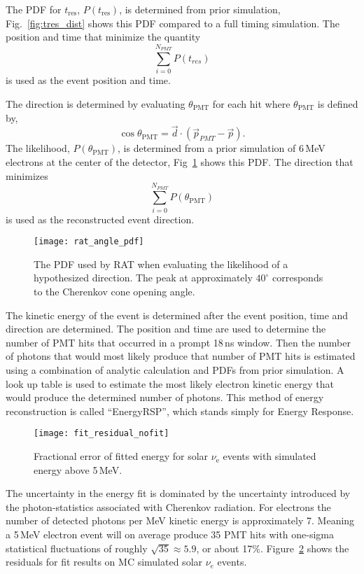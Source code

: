 The PDF for $t_{\mathrm{res}}$, $P(t_{\mathrm{res}})$, is determined from prior simulation,
Fig.~\ref{fig:tres_dist} shows this PDF compared to a full timing simulation.
The position and time that minimize the quantity
\begin{equation}
\sum_{i=0}^{N_{PMT}} P(t_{res}) %
\end{equation}
is used as the event position and time.

The direction is determined by evaluating $\theta_{\mathrm{PMT}}$ for each hit where
$\theta_{\mathrm{PMT}}$ is defined by,
\begin{equation}
    \cos\theta_{\mathrm{PMT}} = \vec{d}\cdot\left(\vec{p}_{PMT} - \vec{p}\right)\text{.}
\end{equation}
The likelihood, $P(\theta_{\mathrm{PMT}})$, is determined from a prior simulation of
6\,MeV electrons at the center of the detector, Fig~\ref{fig:rat_angle_pdf} shows
this PDF\@.
The direction that minimizes
\begin{equation}
\sum_{i=0}^{N_{PMT}} P(\theta_{\mathrm{PMT}})
\end{equation}
is used as the reconstructed event direction.

\begin{figure}[htbp]
\centering
\texttt{[image: rat\_angle\_pdf]}
\caption[RAT PDF for Direction Fit]{The PDF used by RAT when evaluating the
likelihood of a hypothesized direction.  The peak at approximately $40^{\circ}$
corresponds to the Cherenkov cone opening angle.}
\label{fig:rat_angle_pdf}
\end{figure}

The kinetic energy of the event is determined after
the event position, time and direction are determined.
The position and time are used to determine the number of PMT
hits that occurred in a prompt 18\,ns window.
Then the number of photons that would most likely produce
that number of PMT hits is estimated using a combination of
analytic calculation and PDFs from prior simulation.
A look up table is used to estimate the most likely electron
kinetic energy that would produce the determined number of photons.
This method of energy reconstruction is called ``EnergyRSP'', which stands
simply for Energy Response.

\begin{figure}[htbp]
\centering
\texttt{[image: fit\_residual\_nofit]}
\caption[EnergyRSP Fit Residuals]{Fractional error of fitted energy   for solar $\nu_{\mathrm{e}}$ events
with simulated energy above 5\,MeV.
}
\label{fig:mc_fit_residuals}
\end{figure}
The uncertainty in the energy fit is dominated by the uncertainty
introduced by the photon-statistics associated with Cherenkov radiation.
For electrons the number of detected photons per MeV kinetic energy is approximately 7.
Meaning a 5\,MeV electron event will on average produce 35 PMT hits with
one-sigma statistical fluctuations of roughly $\sqrt{35} \approx 5.9$, or about 17\%.
Figure~\ref{fig:mc_fit_residuals} shows the residuals for fit results on MC simulated solar $\nu_{e}$ events.

